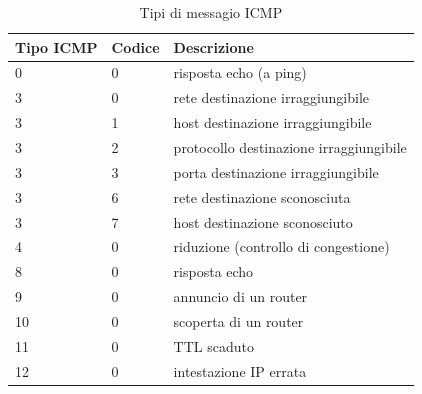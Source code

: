 \documentclass[11pt,a4paper]{article}
\begin{document}
\begin{table}[]
	\begin{tabular}{|l|l|l|}
		\hline
		\textbf{Tipo ICMP} & \textbf{Codice} & \textbf{Descrizione}                    \\ \hline
		0                  & 0               & risposta echo (a ping)                  \\ \hline
		3                  & 0               & rete destinazione irraggiungibile       \\ \hline
		3                  & 1               & host destinazione irraggiungibile       \\ \hline
		3                  & 2               & protocollo destinazione irraggiungibile \\ \hline
		3                  & 3               & porta destinazione irraggiungibile      \\ \hline
		3                  & 6               & rete destinazione sconosciuta           \\ \hline
		3                  & 7               & host destinazione sconosciuto           \\ \hline
		4                  & 0               & riduzione (controllo di congestione)    \\ \hline
		8                  & 0               & risposta echo                           \\ \hline
		9                  & 0               & annuncio di un router                   \\ \hline
		10                 & 0               & scoperta di un router                   \\ \hline
		11                 & 0               & TTL scaduto                             \\ \hline
		12                 & 0               & intestazione IP errata                  \\ \hline
	\end{tabular}
	\caption{Tipi di messagio ICMP}
	\label{tab: 001}
\end{table}
\pagebreak
\end{document}
